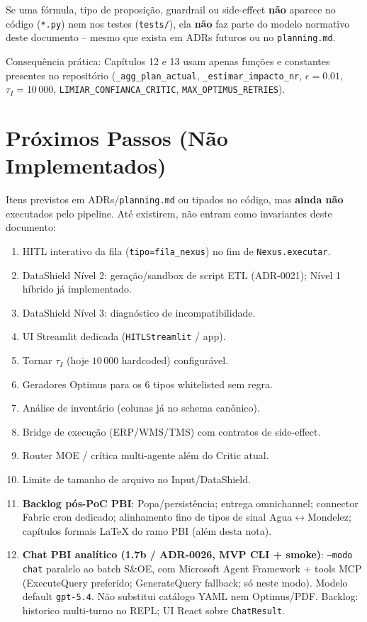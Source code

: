 \documentclass[a4paper, 12pt]{report}
\theoremstyle{definition}
\theoremstyle{remark}
\begin{document}
\begin{caixadecisao}
  Se uma f\'ormula, tipo de proposi\c{c}\~ao, guardrail ou side-effect
  \textbf{n\~ao} aparece no c\'odigo (\texttt{*.py}) nem nos testes
  (\texttt{tests/}), ela \textbf{n\~ao} faz parte do modelo normativo
  deste documento -- mesmo que exista em ADRs futuros ou no
  \texttt{planning.md}.
\end{caixadecisao}

Consequ\^encia pr\'atica: Cap\'itulos 12 e 13 usam apenas fun\c{c}\~oes
e constantes presentes no reposit\'orio
(\texttt{\_agg\_plan\_actual}, \texttt{\_estimar\_impacto\_nr},
$\epsilon=0.01$, $\tau_I=10\,000$,
\texttt{LIMIAR\_CONFIANCA\_CRITIC}, \texttt{MAX\_OPTIMUS\_RETRIES}).


\section{Pr\'oximos Passos (N\~ao Implementados)}

Itens previstos em ADRs/\texttt{planning.md} ou tipados no c\'odigo,
mas \textbf{ainda n\~ao} executados pelo pipeline. At\'e existirem,
n\~ao entram como invariantes deste documento:

\begin{enumerate}
  \item HITL interativo da fila (\texttt{tipo=fila\_nexus}) no fim
    de \texttt{Nexus.executar}.
  \item DataShield N\'ivel 2: gera\c{c}\~ao/sandbox de script ETL
    (ADR-0021); N\'ivel 1 h\'ibrido j\'a implementado.
  \item DataShield N\'ivel 3: diagn\'ostico de incompatibilidade.
  \item UI Streamlit dedicada (\texttt{HITLStreamlit} / app).
  \item Tornar $\tau_I$ (hoje $10\,000$ hardcoded) configur\'avel.
  \item Geradores Optimus para os 6 tipos whitelisted sem regra.
  \item An\'alise de invent\'ario (colunas j\'a no schema can\^onico).
  \item Bridge de execu\c{c}\~ao (ERP/WMS/TMS) com contratos de
    side-effect.
  \item Router MOE / cr\'itica multi-agente al\'em do Critic atual.
  \item Limite de tamanho de arquivo no Input/DataShield.
  \item \textbf{Backlog p\'os-PoC PBI}: Popa/persist\^encia; entrega
    omnichannel; connector Fabric cron dedicado; alinhamento fino de
    tipos de sinal Agua$\leftrightarrow$Mondelez; cap\'itulos formais
    LaTeX do ramo PBI (al\'em desta nota).
  \item \textbf{Chat PBI anal\'itico (1.7b / ADR-0026, MVP CLI + smoke)}:
    \texttt{--modo chat} paralelo ao batch S\&OE, com Microsoft Agent
    Framework + tools MCP (ExecuteQuery preferido; GenerateQuery
    fallback; s\'o neste modo). Modelo default \texttt{gpt-5.4}.
    N\~ao substitui cat\'alogo YAML nem Optimus/PDF.
    Backlog: historico multi-turno no REPL; UI React sobre
    \texttt{ChatResult}.
\end{enumerate}
\end{document}

